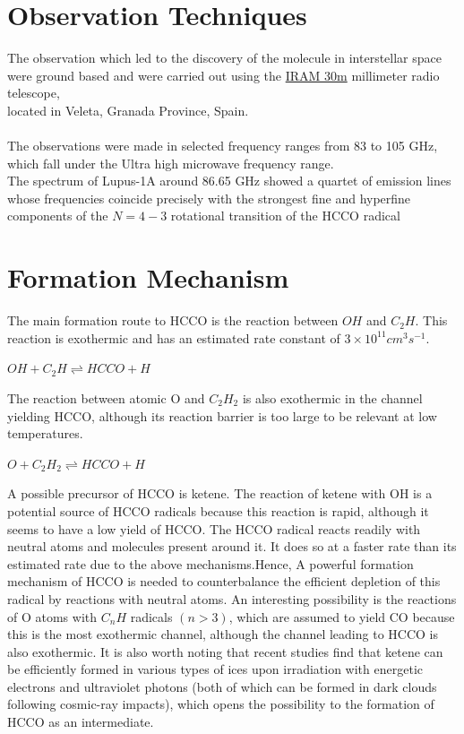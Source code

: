 \documentclass[12 pt]{article}
\begin{document}
	\section*{Observation Techniques}
		The observation which led to the discovery of the molecule in interstellar space were ground based and were carried out using the
		\href{https://en.wikipedia.org/wiki/IRAM_30m_telescope}{IRAM 30m}
		millimeter radio telescope, \\located in Veleta, Granada Province, Spain.\cite{IRAMwiki}
		\\\\The observations were made in selected frequency ranges from 83 to 105 GHz, which fall under the Ultra high microwave frequency 
		range.\cite{EMwiki}
		\\The spectrum of Lupus-1A around 86.65 GHz showed a quartet of emission lines whose frequencies coincide precisely with the	
		strongest fine and hyperfine components of the $N=4-3$ rotational transition of the HCCO radical\cite{mcg}
		
	\section*{Formation Mechanism}
		The main formation  route  to  HCCO  is  the  reaction  between  $OH$  and  $C_{2}H$.
		This reaction is exothermic and has an estimated rate constant
		of $3\times10^{11}cm^3s^{-1}$.
		\begin{center}
		$OH + C_2H \rightleftharpoons HCCO + H $
		\end{center}
		The reaction between  atomic  O  and  $C_2H_2$	is  also  exothermic  in  the  channel yielding HCCO, although its reaction barrier 				is too large to be relevant at low temperatures.
		\begin{center}
		$O + C_2H_2 \rightleftharpoons HCCO + H $
		\end{center}
		A possible precursor of HCCO is ketene. The reaction of ketene with OH is a potential source of HCCO radicals because this 						reaction is rapid, although it seems to have a low yield of HCCO.
		The HCCO radical reacts readily with neutral atoms and molecules present around it. It does so at a faster rate than its estimated rate 		due to the above mechanisms.Hence, A  powerful  formation  mechanism  of  HCCO  is  needed  to counterbalance  the  efficient  					depletion  of  this  radical  by  reactions  with  neutral  atoms.\cite{mcg}  An  interesting  possibility is the reactions of O 							atoms with $C_nH$ radicals $(n>3)$, which are assumed to yield CO because this is the most exothermic channel, although the 						channel leading to HCCO is  also  exothermic.  It  is  also  worth  noting  that  recent  studies find that ketene can
		be  efficiently  formed  in  various  types  of  ices  upon  irradiation with energetic electrons and ultraviolet photons (both of 				which can  be  formed  in  dark  clouds  following  cosmic-ray  impacts), which  opens  the  possibility  to  the  formation  of  HCCO  		as  an intermediate.
				
\end{document}
